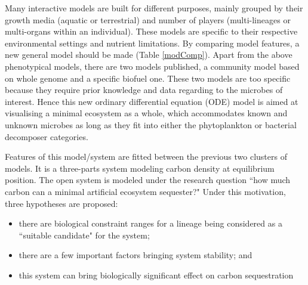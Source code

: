 \documentclass[../thesis.tex]{subfiles} %
\begin{document}
Many interactive models are built for different purposes, mainly grouped by their growth media (aquatic or terrestrial) and number of players (multi-lineages or multi-organs within an individual).  These models are specific to their respective environmental settings and nutrient limitations.  By comparing model features, a new general model should be made (Table \ref{modComp}).  Apart from the above phenotypical models, there are two models published, a community model based on whole genome\autocite{harcombe2014metabolic} and a specific biofuel\autocite{kirthiga2014mathematical} one.  These two models are too specific because they require prior knowledge and data regarding to the microbes of interest.  Hence this new ordinary differential equation (ODE) model is aimed at visualising a minimal ecosystem as a whole, which accommodates known and unknown microbes as long as they fit into either the phytoplankton or bacterial decomposer categories.

Features of this model/system are fitted between the previous two clusters of models.  It is a three-parts system modeling carbon density at equilibrium position.  The open system is modeled under the research question ``how much carbon can a minimal artificial ecosystem sequester?"  Under this motivation, three hypotheses are proposed:
\begin{itemize}
    \item there are biological constraint ranges for a lineage being considered as a ``suitable candidate" for the system;
\end{itemize}

\begin{itemize}
    \item there are a few important factors bringing system stability; and
\end{itemize}

\begin{itemize}
    \item this system can bring biologically significant effect on carbon sequestration
\end{itemize} %
\end{document}
